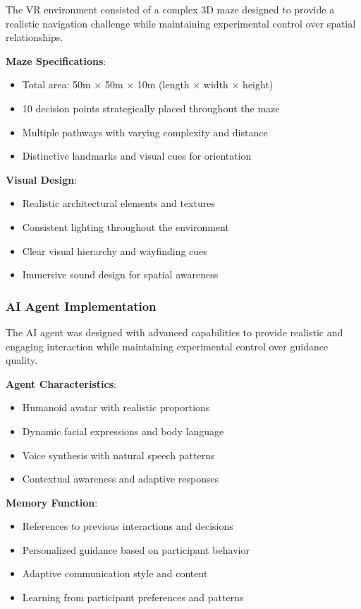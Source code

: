 \documentclass[12pt]{article}
\begin{document}
The VR environment consisted of a complex 3D maze designed to provide a realistic navigation challenge while maintaining experimental control over spatial relationships.

\textbf{Maze Specifications}:
\begin{itemize}
    \item Total area: 50m × 50m × 10m (length × width × height)
    \item 10 decision points strategically placed throughout the maze
    \item Multiple pathways with varying complexity and distance
    \item Distinctive landmarks and visual cues for orientation
\end{itemize}

\textbf{Visual Design}:
\begin{itemize}
    \item Realistic architectural elements and textures
    \item Consistent lighting throughout the environment
    \item Clear visual hierarchy and wayfinding cues
    \item Immersive sound design for spatial awareness
\end{itemize}

\subsubsection{AI Agent Implementation}

The AI agent was designed with advanced capabilities to provide realistic and engaging interaction while maintaining experimental control over guidance quality.

\textbf{Agent Characteristics}:
\begin{itemize}
    \item Humanoid avatar with realistic proportions
    \item Dynamic facial expressions and body language
    \item Voice synthesis with natural speech patterns
    \item Contextual awareness and adaptive responses
\end{itemize}

\textbf{Memory Function}:
\begin{itemize}
    \item References to previous interactions and decisions
    \item Personalized guidance based on participant behavior
    \item Adaptive communication style and content
    \item Learning from participant preferences and patterns
\end{itemize}
\end{document}
